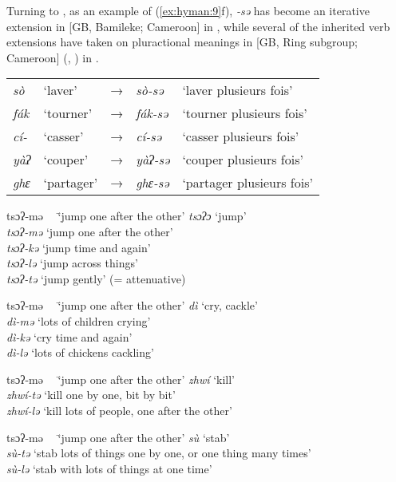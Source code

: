 \documentclass[output=paper]{langsci/langscibook}
\begin{document}
Turning to , as an example of (\ref{ex:hyman:9}f),  \textit{-sə} has become an iterative extension in  [GB, Bamileke; Cameroon] \citep[243]{Nguendjio1989} in , while several of the inherited verb extensions have taken on pluractional meanings in  [GB, Ring subgroup; Cameroon] (\citealt{Jisa1977}, \citealt{Akumbu2008}) in .


\ea 
\label{ex:hyman:10}
\begin{tabular}[t]{@{}llcll@{}}
  \textit{sò } & ‘laver’    & → & \textit{sò-sə } & ‘laver plusieurs fois’\\
  \textit{fák} & ‘tourner’  & → & \textit{fák-sə} & ‘tourner plusieurs fois’\\
  \textit{cí-} & ‘casser’   & → & \textit{cí-sə } & ‘casser plusieurs fois’\\
  \textit{yàʔ} & ‘couper’   & → & \textit{yàʔ-sə} & ‘couper plusieurs fois’\\
  \textit{ghɛ} & ‘partager’ & → & \textit{ghɛ-sə} & ‘partager plusieurs fois’\\
\end{tabular}
\z
  
\ea
\label{ex:hyman:11}
\ea
\begin{tabbing}
 tsɔʔ-mə~~ \= ‘jump one after the other’\kill 
 \textit{tsɔʔɔ  } \>   ‘jump’  \\
 \textit{tsɔʔ-mə} \>  ‘jump one after the other’\\
 \textit{tsɔʔ-kə} \>  ‘jump time and again’\\
 \textit{tsɔʔ-lə} \>  ‘jump across things’\\
 \textit{tsɔʔ-tə} \>  ‘jump gently’ (= attenuative)
\end{tabbing}
 \ex 
\begin{tabbing}
 tsɔʔ-mə~~ \= ‘jump one after the other’\kill 
 \textit{dì   } \> ‘cry, cackle’ \\ 
 \textit{dì-mə} \>  ‘lots of children crying’\\
 \textit{dì-kə} \>  ‘cry time and again’\\
 \textit{dì-lə} \>  ‘lots of chickens cackling’
\end{tabbing}\newpage
 \ex 
  \begin{tabbing}
 tsɔʔ-mə~~ \= ‘jump one after the other’\kill 
 \textit{zhwí   } \>  ‘kill’  \\
 \textit{zhwí-tə} \>  ‘kill one by one, bit by bit’\\
 \textit{zhwí-lə} \>  ‘kill lots of people, one after the other’
  \end{tabbing}
 \ex 
  \begin{tabbing}
 tsɔʔ-mə~~ \= ‘jump one after the other’\kill 
 \textit{sù   } \> ‘stab’  \\
 \textit{sù-tə} \> ‘stab lots of things one by one, or one thing many times’\\
 \textit{sù-lə} \> ‘stab with lots of things at one time’
 \end{tabbing}
 
\end{document}
